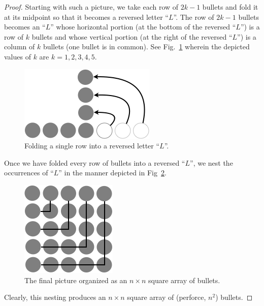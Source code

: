 \begin{proof}
Starting with such a picture, we take each row of $2k-1$ bullets and
fold it at its midpoint so that it becomes a reversed letter ``$L$''.
The row of $2k-1$ bullets becomes an ``$L$'' whose horizontal portion
(at the bottom of the reversed ``$L$'') is a row of $k$ bullets and
whose vertical portion (at the right of the reversed ``$L$'') is a
column of $k$ bullets (one bullet is in common).  See
Fig.~\ref{fig:sumOdds2} wherein the depicted values of $k$ are $k = 1,
2, 3, 4, 5$.
\begin{figure}[ht]
\begin{center}
       \includegraphics[scale=0.4]{FiguresMaths/SumOddsIntermediate}
              \caption{Folding a single row into a reversed letter ``$L$''.}
       \label{fig:sumOdds2}
\end{center}
\end{figure}

Once we have folded every row of bullets into a reversed ``$L$'', we
nest the occurrences of ``$L$'' in the manner depicted in
Fig~\ref{fig:sumOdds3}.
\begin{figure}[ht]
\begin{center}
       \includegraphics[scale=0.4]{FiguresMaths/SumOddsFinal}
\caption{The final picture organized as an $n \times n$ square
  array of bullets.}
       \label{fig:sumOdds3}
\end{center}
\end{figure}
Clearly, this nesting produces an $n \times n$ square array of
(perforce, $n^2$) bullets.
\end{proof}

\medskip

